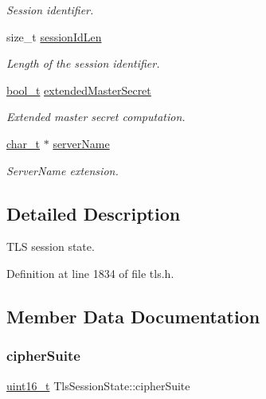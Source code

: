 \begin{DoxyCompactItemize}
\begin{DoxyCompactList}\small\item\em Session identifier. \end{DoxyCompactList}\item 
size\+\_\+t \hyperlink{structTlsSessionState_a679cbf66e41da3f5e6ae7d25c8ef363e}{session\+Id\+Len}
\begin{DoxyCompactList}\small\item\em Length of the session identifier. \end{DoxyCompactList}\item 
\hyperlink{compiler__port_8h_a812d16e5494522586b3784e55d479912}{bool\+\_\+t} \hyperlink{structTlsSessionState_a1345e3eac1e2a0fb86af8e0f0c7b123a}{extended\+Master\+Secret}
\begin{DoxyCompactList}\small\item\em Extended master secret computation. \end{DoxyCompactList}\item 
\hyperlink{compiler__port_8h_a40bb5262bf908c328fbcfbe5d29d0201}{char\+\_\+t} $\ast$ \hyperlink{structTlsSessionState_a9e4b28fa363d10a42e24879e0ba57813}{server\+Name}
\begin{DoxyCompactList}\small\item\em Server\+Name extension. \end{DoxyCompactList}\end{DoxyCompactItemize}


\subsection{Detailed Description}
T\+LS session state. 

Definition at line 1834 of file tls.\+h.



\subsection{Member Data Documentation}
\mbox{\label{structTlsSessionState_a645a198fee226b387ad71fa2df860bd2}} 
\subsubsection{\texorpdfstring{cipher\+Suite}{cipherSuite}}
{\footnotesize\ttfamily \hyperlink{stdint_8h_a273cf69d639a59973b6019625df33e30}{uint16\+\_\+t} Tls\+Session\+State\+::cipher\+Suite}



